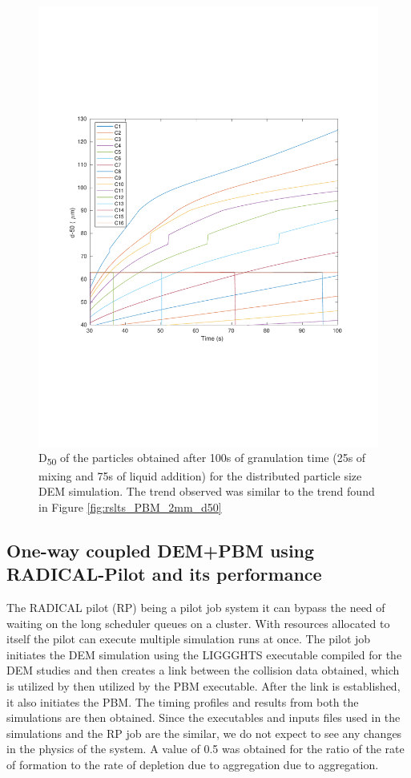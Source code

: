 \documentclass[preprint,11pt,authoryear]{elsarticle}
\begin{document}
\begin{figure}
\centering
\includegraphics[scale=0.5]{rslts_pbm_d50_128_555.pdf}
\caption{D\textsubscript{50} of the particles obtained after 100s of granulation time (25s of mixing and 75s of 
liquid addition) for the distributed particle size DEM simulation. The trend observed was similar to the trend 
found in Figure \ref{fig:rslts_PBM_2mm_d50}}
\label{fig:rslts_PBM_psd_d50}
\end{figure}


\subsection{One-way coupled DEM+PBM using RADICAL-Pilot and its performance} 
The RADICAL pilot (RP) being a pilot job system it can bypass the need of waiting on the long scheduler
queues on a cluster. With resources allocated to itself the pilot can execute multiple simulation runs 
at once. The pilot job initiates the DEM simulation using the LIGGGHTS executable compiled for the DEM
studies and then creates a link between the collision data obtained, which is utilized by then utilized 
by the PBM executable. After the link is established, it also initiates the PBM. The timing profiles and
results from both the simulations are then obtained. Since the executables and inputs files used in the 
simulations and the RP job are the similar, we do not expect to see any changes in the physics of the 
system. A value of 0.5 was obtained for the ratio of the rate of formation to the rate of depletion due to aggregation
due to aggregation.
\end{document}
